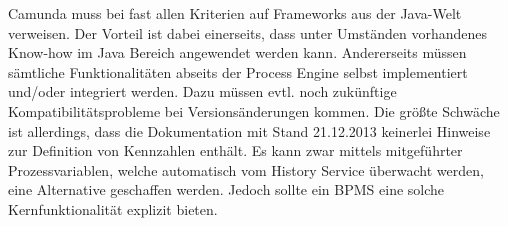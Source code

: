 \smallskip\noindent Camunda muss bei fast allen Kriterien auf Frameworks aus der Java-Welt verweisen. Der Vorteil ist dabei einerseits, dass unter Umständen vorhandenes Know-how im Java Bereich angewendet werden kann. Andererseits müssen sämtliche Funktionalitäten abseits der Process Engine selbst implementiert und/oder integriert werden. Dazu müssen evtl. noch zukünftige Kompatibilitätsprobleme bei Versionsänderungen kommen. Die größte Schwäche ist allerdings, dass die Dokumentation mit Stand 21.12.2013 keinerlei Hinweise zur Definition von Kennzahlen enthält. Es kann zwar mittels mitgeführter Prozessvariablen, welche automatisch vom History Service überwacht werden, eine Alternative geschaffen werden. Jedoch sollte ein \ac{BPMS} eine solche Kernfunktionalität explizit bieten.



